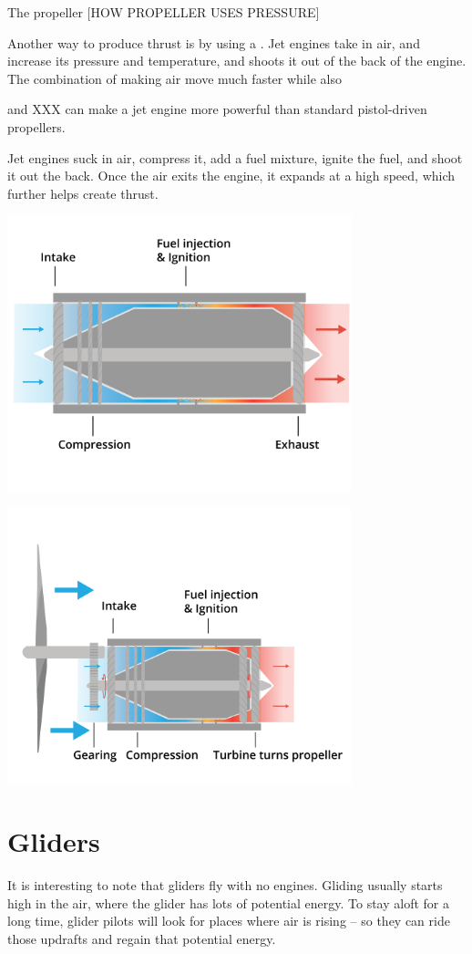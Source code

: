 The propeller [HOW PROPELLER USES PRESSURE]


Another way to produce thrust is by using a . Jet engines take in air, and increase its pressure and temperature, and shoots it out of the back of the engine. The combination of making air move much faster while also 

and XXX can make a jet engine more powerful than standard pistol-driven propellers. 


Jet engines suck in air, compress it, add a fuel mixture, ignite the fuel, and shoot it out the back. Once the air exits the engine, it expands at a high speed, which further helps create thrust. 




\includegraphics[width=0.75\textwidth]{jet.png}



\includegraphics[width=0.75\textwidth]{turboProp.png}


\section{Gliders}

It is interesting to note that gliders fly with no engines.   Gliding usually starts high in the air,  where the glider has lots of potential energy.   To stay aloft for a long
time,  glider pilots will look for places where air is rising -- so they can ride those updrafts and regain that potential energy.

